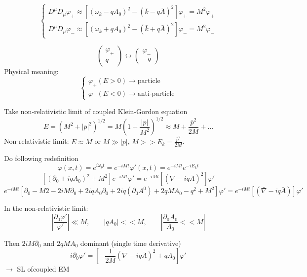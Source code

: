 \[ \begin{cases}
D^{\mu}D_\mu\varphi_+ \approx [(\omega_k - qA_0)^2-(\bar{k}-q\bar{A})^2]\varphi_+ = M^2\varphi_+ \\
D^{\mu}D_\mu\varphi_- \approx [(\omega_k + qA_0)^2-(\bar{k}+q\bar{A})^2]\varphi_- = M^2\varphi_-
\end{cases} \]

\[\begin{pmatrix}
\varphi_+ \\ q
\end{pmatrix} \leftrightarrow \begin{pmatrix}
\varphi_- \\ -q
\end{pmatrix}\]
Physical meaning:
\[ \begin{cases}
\varphi_+(E>0) \to \text{particle} \\
\varphi_-(E<0) \to \text{anti-particle}
\end{cases} \]

Take non-relativistic limit of coupled Klein-Gordon equation
\[ E = (M^2 + |\bar{p}|^2)^{1/2} = M(1+\frac{|p|}{M^2})^{1/2} \approx M + \frac{\bar{p}^2}{2M} + \ldots \]
Non-relativistic limit: $E \approx M$ or $M \gg |\bar{p}|$, $M>>E_k = \frac{\bar{p}^2}{2M}$.

Do following redefinition
\[\varphi(x,t)= e^{i\omega_p t} = e^{-iMt}\varphi'(x,t) = e^{-iMt}e^{-iE_k t}\]
\[ [(\partial_0 + iqA_0)^2 +M^2]e^{-iMt}\varphi'= e^{-iMt}[(\bar{\nabla}-iq\bar{A})^2]\varphi'\]
\[ e^{-iMt}[ \partial_0 - M2 - 2iM\partial_0 + 2iqA_0\partial_0 + 2iq(\partial_0A^0) + 2qMA_0 - q^2 + M^2]\varphi'= e^{-iMt}[(\bar{\nabla} - iq\bar{A})]\varphi' \]

In the non-relativistic limit:
\[ \left| \frac{\partial_0\varphi'}{\varphi'} \right| \ll M, \qquad  |qA_0| << M, \qquad \left| \frac{\partial_0A_0}{A_0} << M \right| \]

Then $2iM\partial_0$ and $2qMA_0$ dominant (single time derivative)
\[ i\partial_0\varphi' = \left[ - \frac{1}{2M} (\bar{\nabla}-iq\bar{A})^2 + q A_0 \right]\varphi' \]
$\to$ SL ofcoupled EM

